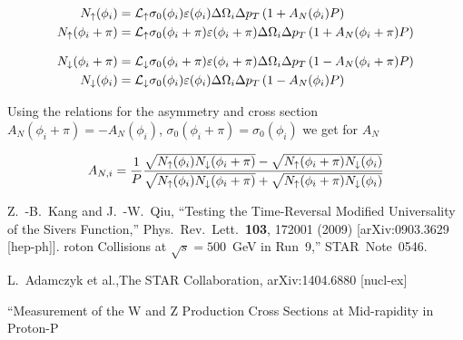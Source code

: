 \documentclass[12pt]{article}
\begin{document}
\begin{align}
N_\uparrow(\phi_i)       &= {\cal L_\uparrow}
   \sigma_{0}(\phi_i) \varepsilon(\phi_i)    \Delta\Omega_i \Delta p_T \left( 1 + A_{N}(\phi_i) P \right) \\
%
N_\uparrow(\phi_i+\pi)       &= {\cal L_\uparrow}
   \sigma_{0}(\phi_i+\pi) \varepsilon(\phi_i+\pi)    \Delta\Omega_i \Delta p_T \left( 1 + A_{N}(\phi_i+\pi) P \right)
\end{align}


\begin{align}
N_\downarrow(\phi_i+\pi) &= {\cal L_\downarrow}
   \sigma_{0}(\phi_i+\pi) \varepsilon(\phi_i+\pi) \Delta\Omega_i \Delta p_T \left( 1 - A_{N}(\phi_i+\pi) P \right) \\
%
N_\downarrow(\phi_i) &= {\cal L_\downarrow}
   \sigma_{0}(\phi_i) \varepsilon(\phi_i) \Delta\Omega_i \Delta p_T \left( 1 - A_{N}(\phi_i) P \right)
\end{align}


Using the relations for the asymmetry and cross section $A_{N}(\phi_i+\pi) =
-A_{N}(\phi_i)$, $\sigma_0(\phi_i+\pi) = \sigma_0(\phi_i)$ we get for $A_N$


\begin{align}
A_{N, i} = \frac{1}{P} \frac{%
\sqrt{N_{\uparrow}(\phi_i)N_{\downarrow}(\phi_i+\pi)} -
\sqrt{N_{\uparrow}(\phi_i+\pi)N_{\downarrow}(\phi_i)}
}{%
\sqrt{N_{\uparrow}(\phi_i)N_{\downarrow}(\phi_i+\pi)} +
\sqrt{N_{\uparrow}(\phi_i+\pi)N_{\downarrow}(\phi_i)}
}
\label{eq:asym_sqrt}
\end{align}

\newpage

\begin{thebibliography}{9}


  Z.~-B.~Kang and J.~-W.~Qiu,
  ``Testing the Time-Reversal Modified Universality of the Sivers Function,''
  Phys.\ Rev.\ Lett.\  {\bf 103}, 172001 (2009)
  [arXiv:0903.3629 [hep-ph]].
roton Collisions at $\sqrt{s} = 500$~GeV in Run~9,'' STAR~Note~0546.

L.~Adamczyk et al.,The STAR Collaboration, arXiv:1404.6880 [nucl-ex]

``Measurement of the W and Z Production Cross Sections at Mid-rapidity in Proton-P

\end{thebibliography}
\end{document}
